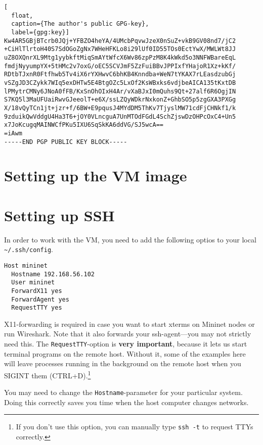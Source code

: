 \begin{lstlisting}[
  float,
  caption={The author's public GPG-key},
  label={gpg:key}]
Kw4AR5GBjBTcrb0JQj+YFBZO4heYA/4UMcbPqvwJzeX0nSuZ+vkB9GV08nd7/jC2
+CiHlTlrtoH40S7SdOGoZgNx7WHeHFKLo8i29lUf0ID55TOs0EctYwX/MWLWt8JJ
uZ8OXQnrXL9Mtg1yybkftMiqSmAYtWfcX6Wv86zpPzM8K4kWkd5o3NNFWBareEqL
fmdjNyyumpYX+5tHMc2v7oxG/oEC5SCVJmF5ZzFuiBBvJPPIxfYHajoR1Xz+kKf/
RDtbTJxnR0Ftfhwb5Tv4iX6rYXHwvC6bhKB4Knndba+WeN7tYKAX7rLEasdzubGj
vSZgJD3CZykk7WIq5exDHTw5E4BtgOZc5LxOf2KsWBxks6vdjbeAICA135tKxtDB
lPMytrCMNy6JNoA0fFB/KxSnOhOIxH4Ar/vXaBJxI0mQuhs9Qt+27alf6R6OgjIN
S7KQ5l3MaUFUaiRwvGJeeolT+e6X/ssLZQyWDkrNxkonZ+GhbSO5p5zgGXA3PXGg
X/18vQyTCn1jt+jzr+f/6BW+E9pqusJ4MYdDM5ThKv7TjyslMW71cdFjCHNkf1/k
9zduikQwVddgU4Ha3T6+jOY0VLncguA7UnMTOdFGdL4SchZjswDzOHPcOxC4+Un5
x7JoKcugqMAINWCfPKu5IXU6SqSkKA6ddVG/SJ5wcA==
=iAwm
-----END PGP PUBLIC KEY BLOCK-----
\end{lstlisting}
\clearpage %

\section{Setting up the VM image}


\section{Setting up SSH}
\label{chapter:ssh.setup}

In order to work with the VM, you need to add the following optios to your
local \texttt{\~{}/.ssh/config}.

\begin{verbatim}
Host mininet
  Hostname 192.168.56.102
  User mininet
  ForwardX11 yes
  ForwardAgent yes
  RequestTTY yes
\end{verbatim}

X11-forwarding is required in case you want to start xterms on Mininet
nodes or run Wireshark.  Note that it also forwards your
ssh-agent---you may not strictly need this.  The \texttt{RequestTTY}-option
is \textbf{very important}, because it lets us start terminal programs on the remote
host. Without it, some of the examples here will leave processes running in
the background on the remote host when you SIGINT them (CTRL+D).\footnote{If
you don't use this option, you can manually type \texttt{ssh -t} to request
TTYs correctly.}

You may need to change the \texttt{Hostname}-parameter for your particular
system.  Doing this correctly saves you time when the host computer changes
networks.

